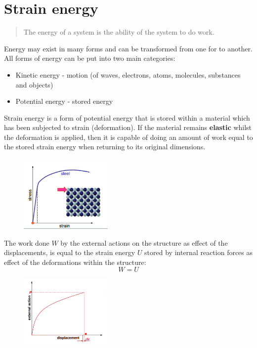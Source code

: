 \documentclass[class=report, crop=false, 12pt,a4paper]{standalone}
\begin{document}
\section{Strain energy}
\begin{quotation}
  The energy of a system is the ability of the system to do work.
\end{quotation}
Energy may exist in many forms and can be transformed from one for to another. All forms of energy can be put into two main categories:
\begin{itemize}
  \item Kinetic energy - motion (of waves, electrons, atoms, molecules, substances and objects)
  \item Potential energy - stored energy
\end{itemize}
Strain energy is a form of potential energy that is stored within a material which has been subjected to strain (deformation). If the material remains \textbf{elastic} whilst the deformation is applied, then it is capable of doing an amount of work equal to the stored strain energy when returning to its original dimensions.
\begin{figure}[H]
  \centering
  \includegraphics[width = 0.4\textwidth]{../img/diagram8.png}
  \caption{}
\end{figure}
The work done $W$ by the external actions on the structure as effect of the displacements, is equal to the strain energy $U$ stored by internal reaction forces as effect of the deformations within the structure:
\begin{equation}
  W = U
\end{equation}
\begin{figure}[H]
  \centering
  \includegraphics[width = 0.4\textwidth]{../img/diagram9.png}
  \caption{}
\end{figure}
\end{document}

